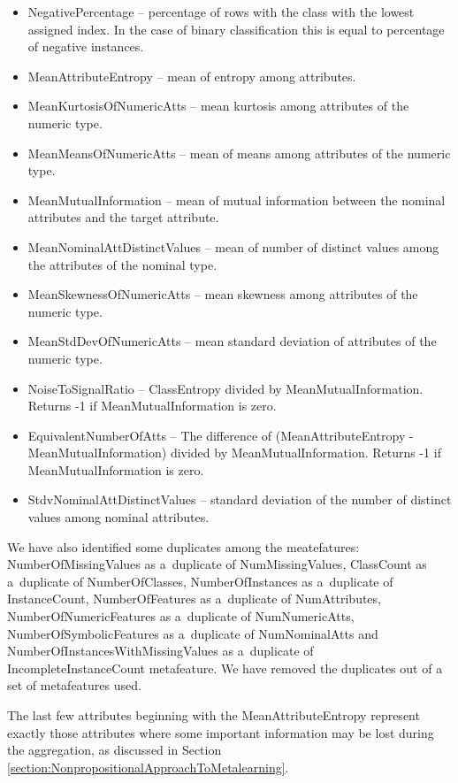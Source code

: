 \begin{itemize}
	\item NegativePercentage -- percentage of rows with the class with the lowest assigned index. In the case of binary classification this is equal to percentage of negative instances.	
	\item MeanAttributeEntropy -- mean of entropy among attributes.
	\item MeanKurtosisOfNumericAtts -- mean kurtosis among attributes of the numeric type.
	\item MeanMeansOfNumericAtts -- mean of means among attributes of the numeric type.
	\item MeanMutualInformation -- mean of mutual information between the nominal attributes and the target attribute.
	\item MeanNominalAttDistinctValues -- mean of number of distinct values among the attributes of the nominal type.
	\item MeanSkewnessOfNumericAtts -- mean skewness among attributes of the numeric type.
	\item MeanStdDevOfNumericAtts -- mean standard deviation of attributes of the numeric type.
	\item NoiseToSignalRatio -- ClassEntropy divided by MeanMutualInformation. Returns -1 if MeanMutualInformation is zero.
	\item EquivalentNumberOfAtts -- The difference of (MeanAttributeEntropy - MeanMutualInformation) divided by MeanMutualInformation. Returns -1 if MeanMutualInformation is zero.
	\item StdvNominalAttDistinctValues -- standard deviation of the number of distinct values among nominal attributes.
\end{itemize}

We have also identified some duplicates among the meatefatures: \\ NumberOfMissingValues as a~duplicate of NumMissingValues, ClassCount as a~duplicate of NumberOfClasses, NumberOfInstances as a~duplicate of InstanceCount, NumberOfFeatures as a~duplicate of NumAttributes, NumberOfNumericFeatures as a~duplicate of NumNumericAtts, NumberOfSymbolicFeatures as a~duplicate of NumNominalAtts and NumberOfInstancesWithMissingValues as a~duplicate of IncompleteInstanceCount metafeature. We have removed the duplicates out of a set of metafeatures used.

The last few attributes beginning with the MeanAttributeEntropy represent exactly those attributes where some important information may be lost during the aggregation, as discussed in Section \ref{section:NonpropositionalApproachToMetalearning}.

